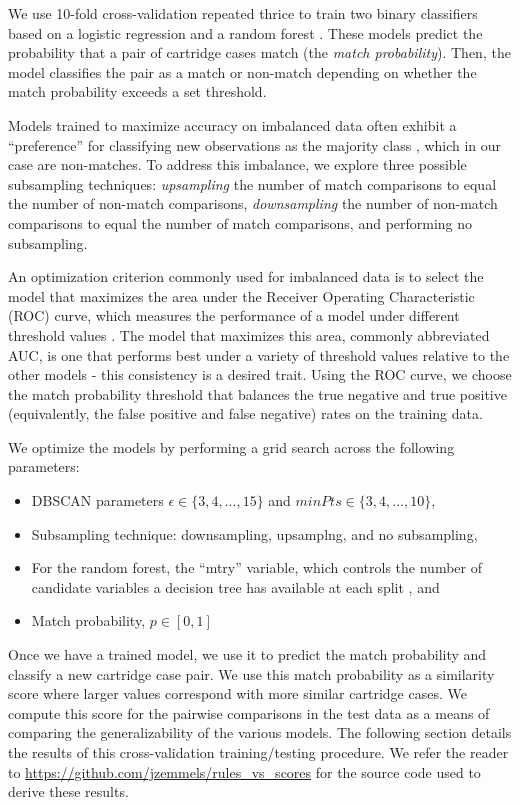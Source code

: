 \documentclass[reprint]{JASA}
\begin{document}
We use 10-fold cross-validation repeated thrice \citep{caret} to train
two binary classifiers based on a logistic regression and a random
forest \citep{breiman, randomForest}. These models predict the
probability that a pair of cartridge cases match (the \emph{match
probability}). Then, the model classifies the pair as a match or
non-match depending on whether the match probability exceeds a set
threshold.

Models trained to maximize accuracy on imbalanced data often exhibit a
``preference'' for classifying new observations as the majority class
\citep{Fernndez2018}, which in our case are non-matches. To address this
imbalance, we explore three possible subsampling techniques:
\emph{upsampling} the number of match comparisons to equal the number of
non-match comparisons, \emph{downsampling} the number of non-match
comparisons to equal the number of match comparisons, and performing no
subsampling.

An optimization criterion commonly used for imbalanced data is to select
the model that maximizes the area under the Receiver Operating
Characteristic (ROC) curve, which measures the performance of a model
under different threshold values \citep{James2013}. The model that
maximizes this area, commonly abbreviated AUC, is one that performs best
under a variety of threshold values relative to the other models - this
consistency is a desired trait. Using the ROC curve, we choose the match
probability threshold that balances the true negative and true positive
(equivalently, the false positive and false negative) rates on the
training data.

We optimize the models by performing a grid search across the following
parameters:

\begin{itemize}
\item
  DBSCAN parameters \(\epsilon \in \{3,4,...,15\}\) and
  \(minPts \in \{3,4,...,10\}\),
\item
  Subsampling technique: downsampling, upsamplng, and no subsampling,
\item
  For the random forest, the ``mtry'' variable, which controls the
  number of candidate variables a decision tree has available at each
  split \citep{breiman}, and
\item
  Match probability, \(p \in [0,1]\)
\end{itemize}

Once we have a trained model, we use it to predict the match probability
and classify a new cartridge case pair. We use this match probability as
a similarity score where larger values correspond with more similar
cartridge cases. We compute this score for the pairwise comparisons in
the test data as a means of comparing the generalizability of the
various models. The following section details the results of this
cross-validation training/testing procedure. We refer the reader to
\url{https://github.com/jzemmels/rules_vs_scores} for the source code
used to derive these results.
\end{document}
